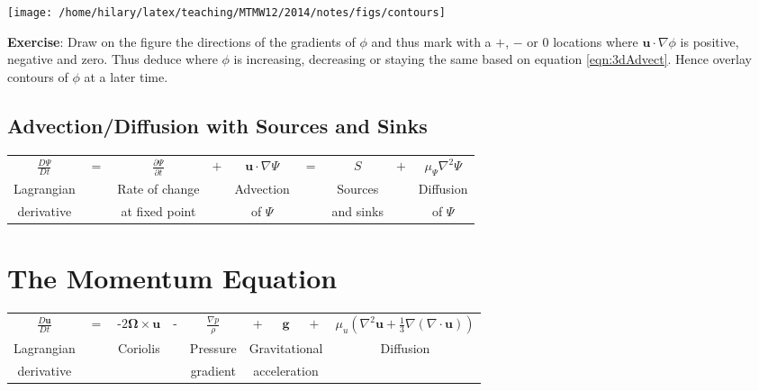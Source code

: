 \noindent %
\begin{minipage}[c]{0.5\linewidth}%
 \vspace{1cm}
 \texttt{[image: /home/hilary/latex/teaching/MTMW12/2014/notes/figs/contours]} %
\end{minipage}\hfill{}%
\begin{minipage}[c]{0.43\linewidth}%
\textbf{Exercise}: Draw on the figure the directions of the gradients
of $\phi$ and thus mark with a $+$, $-$ or $0$ locations where
$\mathbf{u}\cdot\nabla\phi$ is positive, negative and zero. Thus
deduce where $\phi$ is increasing, decreasing or staying the same
based on equation \ref{eqn:3dAdvect}. Hence overlay contours of $\phi$
at a later time. %
\end{minipage}

\clearpage{}


\subsection{Advection/Diffusion with Sources and Sinks\label{sub:AdvDiff}}

\begin{center}
\begin{tabular}{ccccccccc}
$\frac{D\Psi}{Dt}$ & $=$ & $\frac{\partial\Psi}{\partial t}$ & $+$ & $\mathbf{u}\cdot\nabla\Psi$ & $=$ & $S$ & $+$ & $\mu_{\Psi}\nabla^{2}\Psi$\tabularnewline
Lagrangian &  & Rate of change &  & Advection &  & Sources &  & Diffusion\tabularnewline
derivative &  & at fixed point &  & of $\Psi$ &  & and sinks &  & of $\Psi$\tabularnewline
\end{tabular}
\par\end{center}



\section{The Momentum Equation\label{sec:momEqn}}

\begin{center}
\begin{tabular}{ccccccccc}
$\frac{D\mathbf{u}}{Dt}$ & $=$ & $\text{-}2\bm{\Omega}\times\mathbf{u}$ & - & $\frac{\nabla p}{\rho}$ & + & $\mathbf{g}$ & $+$ & $\mu_{u}\left(\nabla^{2}\mathbf{u}+\frac{1}{3}\nabla(\nabla\cdot\mathbf{u})\right)$\tabularnewline
Lagrangian &  & Coriolis &  & Pressure & \multicolumn{3}{c}{Gravitational} & Diffusion\tabularnewline
derivative &  &  &  & gradient & \multicolumn{3}{c}{acceleration} & \tabularnewline
\end{tabular}
\par\end{center}


